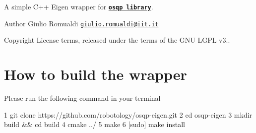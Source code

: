 A simple C++ Eigen wrapper for \href{https://osqp.org/}{\tt {\bfseries osqp library}}. \begin{DoxyAuthor}{Author}
Giulio Romualdi \href{mailto:giulio.romualdi@iit.it}{\tt giulio.\+romualdi@iit.\+it} ~\newline
 
\end{DoxyAuthor}
\begin{DoxyCopyright}{Copyright}
License terms, released under the terms of the G\+NU L\+G\+PL v3..
\end{DoxyCopyright}
\hypertarget{index_build-section}{}\section{How to build the wrapper}\label{index_build-section}
Please run the following command in your terminal 
\begin{DoxyCode}
1 git clone https://github.com/robotology/osqp-eigen.git
2 cd osqp-eigen
3 mkdir build && cd build
4 cmake ../
5 make
6 [sudo] make install
\end{DoxyCode}


